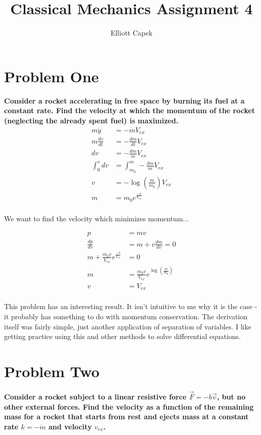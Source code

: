 \documentclass[10pt]{article} %
\title{Classical Mechanics Assignment 4}
\author{Elliott Capek}
\begin{document}
\maketitle{}

\section{Problem One}
\textbf{Consider a rocket accelerating in free space by burning its fuel at a constant rate. Find the velocity at which the momentum of the rocket (neglecting the already spent fuel) is maximized.} \\

\begin{align*}
  m\ddot{y} &= -\dot{m}V_{ex}\\
  m\frac{dv}{dt} &= -\frac{dm}{dt}V_{ex}\\
  dv &= -\frac{dm}{m}V_{ex}\\
  \int_0^v dv &= \int_{m_0}^m-\frac{dm}{m}V_{ex}\\
  v &= -\log(\frac{m}{m_0})V_{ex}\\
  m &= m_0e^{\frac{-v}{V_{ex}}}\\
\end{align*}

We want to find the velocity which minimizes momentum...

\begin{align*}
  p &= mv\\
  \frac{dp}{dv} &= m + v\frac{dm}{dv} = 0\\
  m + \frac{m_0v}{V_{ex}}e^{\frac{-v}{V_{ex}}} &= 0\\
  m &= \frac{m_0v}{V_{ex}}e^{\log(\frac{m}{m_0})}\\
  v &= V_{ex}\\
\end{align*}

This problem has an interesting result. It isn't intuitive to me why it is the case - it probably has something to do with momentum conservation. The derivation itself was fairly simple, just another application of separation of variables. I like getting practice using this and other methods to solve differential equations.\\

\section{Problem Two}
\textbf{Consider a rocket subject to a linear resistive force $\vec{F} = -b\vec{v}$, but no other external forces. Find the velocity as a function of the remaining mass for a rocket that starts from rest and ejects mass at a constant rate $k = -\dot{m}$ and velocity $v_{ex}$.} \\
\end{document}
